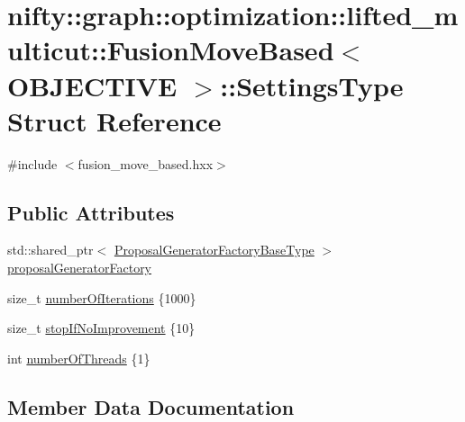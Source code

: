 \hypertarget{structnifty_1_1graph_1_1optimization_1_1lifted__multicut_1_1FusionMoveBased_1_1SettingsType}{}\section{nifty\+:\+:graph\+:\+:optimization\+:\+:lifted\+\_\+multicut\+:\+:Fusion\+Move\+Based$<$ O\+B\+J\+E\+C\+T\+I\+V\+E $>$\+:\+:Settings\+Type Struct Reference}
\label{structnifty_1_1graph_1_1optimization_1_1lifted__multicut_1_1FusionMoveBased_1_1SettingsType}


{\ttfamily \#include $<$fusion\+\_\+move\+\_\+based.\+hxx$>$}

\subsection*{Public Attributes}
\begin{DoxyCompactItemize}
\item 
std\+::shared\+\_\+ptr$<$ \hyperlink{classnifty_1_1graph_1_1optimization_1_1lifted__multicut_1_1FusionMoveBased_a7ce904e15086b0dffc73d1fc35a1f7ac}{Proposal\+Generator\+Factory\+Base\+Type} $>$ \hyperlink{structnifty_1_1graph_1_1optimization_1_1lifted__multicut_1_1FusionMoveBased_1_1SettingsType_a06128f5a737807cf50f3052643818e60}{proposal\+Generator\+Factory}
\item 
size\+\_\+t \hyperlink{structnifty_1_1graph_1_1optimization_1_1lifted__multicut_1_1FusionMoveBased_1_1SettingsType_a45204944a894e1688dd1a36a157f3c52}{number\+Of\+Iterations} \{1000\}
\item 
size\+\_\+t \hyperlink{structnifty_1_1graph_1_1optimization_1_1lifted__multicut_1_1FusionMoveBased_1_1SettingsType_a36f79a9a21dfb8f914cc1f556c9d8fe6}{stop\+If\+No\+Improvement} \{10\}
\item 
int \hyperlink{structnifty_1_1graph_1_1optimization_1_1lifted__multicut_1_1FusionMoveBased_1_1SettingsType_abd26f82e899d286b9507df3e45b13b80}{number\+Of\+Threads} \{1\}
\end{DoxyCompactItemize}


\subsection{Member Data Documentation}
\hypertarget{structnifty_1_1graph_1_1optimization_1_1lifted__multicut_1_1FusionMoveBased_1_1SettingsType_a45204944a894e1688dd1a36a157f3c52}{}
